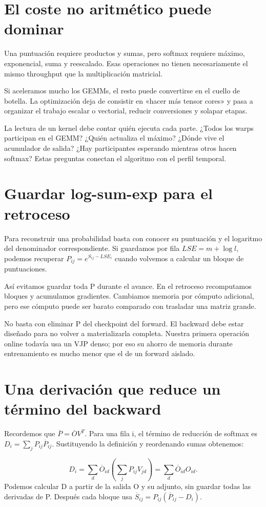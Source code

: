 \documentclass[12pt,a4paper,oneside]{report}
\begin{document}
\section{El coste no aritmético puede dominar}
Una puntuación requiere productos y sumas, pero softmax requiere máximo, exponencial, suma y reescalado. Esas operaciones no tienen necesariamente el mismo throughput que la multiplicación matricial.

Si aceleramos mucho los GEMMs, el resto puede convertirse en el cuello de botella. La optimización deja de consistir en «hacer más tensor cores» y pasa a organizar el trabajo escalar o vectorial, reducir conversiones y solapar etapas.

La lectura de un kernel debe contar quién ejecuta cada parte. ¿Todos los warps participan en el GEMM? ¿Quién actualiza el máximo? ¿Dónde vive el acumulador de salida? ¿Hay participantes esperando mientras otros hacen softmax? Estas preguntas conectan el algoritmo con el perfil temporal.

\section{Guardar log-sum-exp para el retroceso}
Para reconstruir una probabilidad basta con conocer su puntuación y el logaritmo del denominador correspondiente. Si guardamos por fila $LSE=m+\log l$, podemos recuperar $P_{ij}=e^{S_{ij}-LSE_i}$ cuando volvemos a calcular un bloque de puntuaciones.

Así evitamos guardar toda P durante el avance. En el retroceso recomputamos bloques y acumulamos gradientes. Cambiamos memoria por cómputo adicional, pero ese cómputo puede ser barato comparado con trasladar una matriz grande.

No basta con eliminar P del checkpoint del forward. El backward debe estar diseñado para no volver a materializarla completa. Nuestra primera operación online todavía usa un VJP denso; por eso su ahorro de memoria durante entrenamiento es mucho menor que el de un forward aislado.

\section{Una derivación que reduce un término del backward}
Recordemos que $\overline P=\overline O V^T$. Para una fila i, el término de reducción de softmax es $D_i=\sum_jP_{ij}\overline P_{ij}$. Sustituyendo la definición y reordenando sumas obtenemos:

\[
D_i=\sum_d \overline O_{id}\left(\sum_jP_{ij}V_{jd}\right)
=\sum_d\overline O_{id}O_{id}.
\]
Podemos calcular D a partir de la salida O y su adjunto, sin guardar todas las derivadas de P. Después cada bloque usa $\overline S_{ij}=P_{ij}(\overline P_{ij}-D_i)$.
\end{document}
